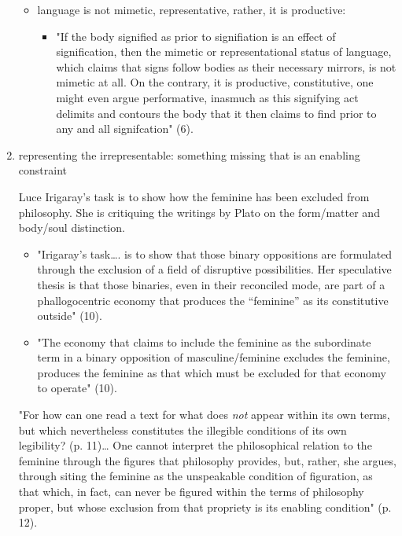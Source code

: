 \documentclass[11pt]{article}
\begin{document}
\begin{enumerate}
\begin{itemize}
\item language is not mimetic, representative, rather, it is productive:
\begin{itemize}
\item "If the body signified as prior to signifiation is an effect of
signification, then the mimetic or representational status of
language, which claims that signs follow bodies as their
necessary mirrors, is not mimetic at all. On the contrary, it is
productive, constitutive, one might even argue performative,
inasmuch as this signifying act delimits and contours the body
that it then claims to find prior to any and all signifcation"
(6).
\end{itemize}
\end{itemize}


\item representing the irrepresentable: something missing that is an
\label{sec:orgfb9d974}
enabling constraint 

Luce Irigaray's task is to show how the feminine has been excluded
from philosophy. She is critiquing the writings by Plato on the
form/matter and body/soul distinction.
\begin{itemize}
\item "Irigaray's task\ldots{}. is to show that those binary oppositions are
formulated through the exclusion of a field of disruptive
possibilities. Her speculative thesis is that those binaries, even
in their reconciled mode, are part of a phallogocentric economy that
produces the “feminine” as its constitutive outside" (10).
\item "The economy that claims to include the feminine as the subordinate
term in a binary opposition of masculine/feminine excludes the
feminine, produces the feminine as that which must be excluded for
that economy to operate" (10).
\end{itemize}

"For how can one read a text for what does \emph{not} appear within its own
terms, but which nevertheless constitutes the illegible conditions of
its own legibility? (p. 11)\ldots{} One cannot interpret the philosophical
relation to the feminine through the figures that philosophy provides,
but, rather, she argues, through siting the feminine as the
unspeakable condition of figuration, as that which, in fact, can never
be figured within the terms of philosophy proper, but whose exclusion
from that propriety is its enabling condition" (p. 12).


\end{enumerate}
\end{document}
